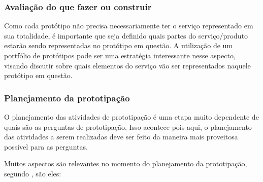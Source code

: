 \subsubsection{Avaliação do que fazer ou construir}

Como cada protótipo não precisa necessariamente ter o serviço representado em sua totalidade, é importante que seja definido quais partes do serviço/produto estarão sendo representadas no protótipo em questão. A utilização de um portfólio de protótipos pode ser uma estratégia interessante nesse aspecto, visando discutir sobre quais elementos do serviço vão ser representados naquele protótipo em questão.

\subsubsection{Planejamento da prototipação}

O planejamento das atividades de prototipação é uma etapa muito dependente de quais são as perguntas de prototipação. Isso acontece pois aqui, o planejamento das atividades a serem realizadas deve ser feito da maneira mais proveitosa possível para as perguntas.

Muitos aspectos são relevantes no momento do planejamento da prototipação, segundo \cite{Stickdorn2019}, são eles:

